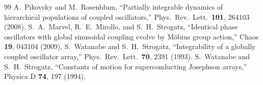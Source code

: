 \documentclass[11pt]{article}
\begin{document}
\begin{thebibliography}{99}
 A.~Pikovsky and M.~Rosenblum, ``Partially integrable dynamics of hierarchical populations of coupled oscillators,'' Phys.\ Rev.\ Lett.\ \textbf{101}, 264103 (2008).
 S.~A.~Marvel, R.~E.~Mirollo, and S.~H.~Strogatz, ``Identical phase oscillators with global sinusoidal coupling evolve by M\"obius group action,'' Chaos \textbf{19}, 043104 (2009).
 S.~Watanabe and S.~H.~Strogatz, ``Integrability of a globally coupled oscillator array,'' Phys.\ Rev.\ Lett.\ \textbf{70}, 2391 (1993).
 S.~Watanabe and S.~H.~Strogatz, ``Constants of motion for superconducting Josephson arrays,'' Physica D \textbf{74}, 197 (1994).
\end{thebibliography}
\end{document}

